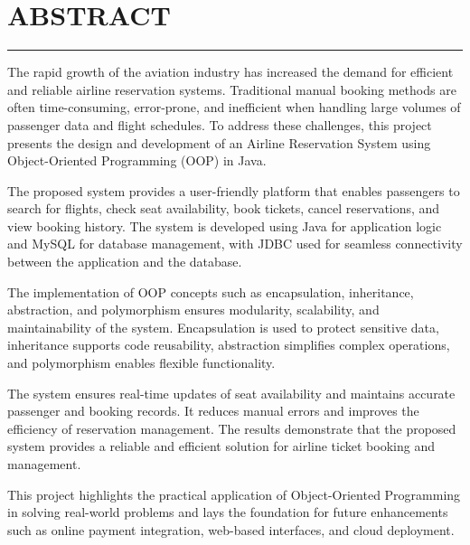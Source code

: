 \chapter*{ABSTRACT}
\noindent\rule{\linewidth}{2pt}

\vspace{0pt}

\vspace{30pt}

\noindent
The rapid growth of the aviation industry has increased the demand for efficient and reliable airline reservation systems. Traditional manual booking methods are often time-consuming, error-prone, and inefficient when handling large volumes of passenger data and flight schedules. To address these challenges, this project presents the design and development of an Airline Reservation System using Object-Oriented Programming (OOP) in Java.

\par
The proposed system provides a user-friendly platform that enables passengers to search for flights, check seat availability, book tickets, cancel reservations, and view booking history. The system is developed using Java for application logic and MySQL for database management, with JDBC used for seamless connectivity between the application and the database.

\par
The implementation of OOP concepts such as encapsulation, inheritance, abstraction, and polymorphism ensures modularity, scalability, and maintainability of the system. Encapsulation is used to protect sensitive data, inheritance supports code reusability, abstraction simplifies complex operations, and polymorphism enables flexible functionality.

\par
The system ensures real-time updates of seat availability and maintains accurate passenger and booking records. It reduces manual errors and improves the efficiency of reservation management. The results demonstrate that the proposed system provides a reliable and efficient solution for airline ticket booking and management.

\par
This project highlights the practical application of Object-Oriented Programming in solving real-world problems and lays the foundation for future enhancements such as online payment integration, web-based interfaces, and cloud deployment.